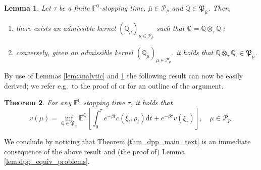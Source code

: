 \documentclass{article}
\newtheorem{theorem}{Theorem}[section]
\newtheorem{lemma}[theorem]{Lemma}
\theoremstyle{definition}
\numberwithin{equation}{section}
\numberwithin{theorem}{section}
\newcommand{\E}{\mathbb{E}}
\newcommand{\Pp}{\mathbb{Q}}
\newcommand{\dt}{\mathrm{d}t}
\newcommand{\Fb}{\mathbb{F}}
\newcommand{\Pc}{\mathcal{P}}
\newcommand{\Pk}{\mathfrak{P}}
\begin{document}
\begin{appendix}
	\begin{lemma}\label{lem:concatenation}
          Let $\tau$ be a
          finite $\Fb^0$-stopping time, $\bar\mu\in\Pc_p$ and $\Pp\in\Pk_{\bar\mu}$. 
          Then,
		\begin{enumerate}
			\item there exists an admissible kernel $(\Pp_\mu)_{\mu\in\Pc_p}$ such that $\Pp=\Pp\otimes_\tau\Pp_\cdot$; 
			\item conversely, given an admissible kernel $(\Pp_\mu)_{\mu\in\Pc_p}$, it holds that $\Pp\otimes_\tau\Pp_\cdot\in\Pk_{\bar\mu}$.
		\end{enumerate}
	\end{lemma}
	
	
	By use of Lemmas \ref{lem:analytic} and \ref{lem:concatenation} the following result can now be easily derived; we refer e.g.~to the proof of \cite[Theorem~2.1]{karoui2013_2} or \cite[Theorem~2.4]{zitkovic2014} for an outline of the argument.
	

\begin{theorem}\label{thm:dpp}
  For any $\Fb^0$ stopping time $\tau$, it holds that
  	\begin{equation*}
    	v(\mu)=\inf_{\Pp\in\Pk_\mu}\E^\Pp\left[\int_0^\tau e^{-\beta t}c(\xi_t,\rho_t)\dt+e^{-\beta \tau} v(\xi_\tau)\right],
   		\quad \mu\in\Pc_p.
  	\end{equation*}
\end{theorem}

	We conclude by noticing that Theorem \ref{thm_dpp_main_text} is an immediate consequence of the above result and (the proof of) Lemma \ref{lem:dpp_equiv_problems}.
	
	
	
	
	
	
	
	
	

\end{appendix}
\end{document}
